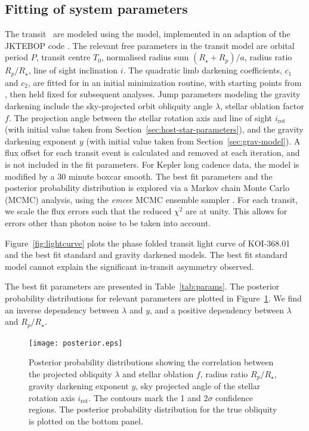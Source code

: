 \documentclass[iop]{emulateapj}
\begin{document}
\subsection{Fitting of system parameters}
\label{sec:model-fitting}

The transit \lcs\ are modeled using the
\citet{Nelson1972} model, implemented in an adaption of the
JKTEBOP code \citep{Proper1981,Southworth2004}. The
relevant free parameters in the transit model are orbital period $P$, transit centre $T_0$,
normalised radius sum $(R_\star+R_p) / a$, radius ratio $R_p/R_\star$,
line of sight inclination $i$. The quadratic limb darkening coefficients,
$c_1$ and $c_2$, are fitted for in an initial minimization routine, with 
starting points from \citet{Sing2010}, then held fixed for 
subsequent analyses. Jump parameters modeling the gravity darkening 
include the sky-projected orbit obliquity angle $\lambda$, stellar oblation factor $f$. The 
projection angle between the stellar rotation axis and line of sight 
$i_\text{rot}$ (with initial value taken from Section~\ref{sec:host-star-parameters}), 
and the gravity darkening exponent $y$ (with initial value taken from Section~\ref{sec:grav-model}). 
A flux offset for each transit event is calculated and removed at each iteration, and is not 
included in the fit parameters. For Kepler long cadence data, the model is 
modified by a 30 minute boxcar smooth. The best fit parameters and the 
posterior probability distribution is explored via a Markov chain Monte Carlo
(MCMC) analysis, using the \emph{emcee} MCMC ensemble sampler
\citep{ForemanMackey2012}. For each transit, we scale the flux errors such
that the reduced $\chi^2$ are at unity. This allows for errors other
than photon noise to be taken into account.

Figure~\ref{fig:lightcurve} plots the phase folded transit light curve of
KOI-368.01 and the best fit standard and gravity darkened models. The best fit
standard model cannot explain the significant in-transit
asymmetry observed. 

The best fit parameters are presented in Table~\ref{tab:params}.
The posterior probability distributions for relevant parameters
are plotted in Figure~\ref{fig:posterior}. We find an inverse dependency
between $\lambda$ and $y$, and a positive dependency between
$\lambda$ and $R_p/R_\star$.



\begin{figure}
  \centering
  \texttt{[image: posterior.eps]}
  \caption{Posterior probability distributions showing the correlation
  between the projected obliquity $\lambda$ and stellar oblation $f$,
  radius ratio $R_p/R_\star$, gravity darkening exponent $y$, sky
  projected angle of the stellar rotation axis $i_\text{rot}$. The
  contours mark the 1 and 2$\sigma$ confidence regions. The posterior probability distribution 
for the true obliquity is plotted on the bottom panel.}
  \label{fig:posterior}
\end{figure}
\end{document}
